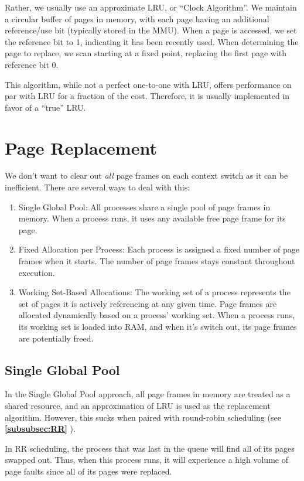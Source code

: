 \documentclass{report}
\newcommand{\exampleBegin}[1]{\begin{tcolorbox}[colback=blue!5!white,colframe=black!75!blue,title={Example:
      #1}]}
\newcommand{\exampleEnd}{\end{tcolorbox}}
\newcommand{\refto}[2]{\textbf{\ref{#1:#2} \nameref{#1:#2}}}
\begin{document}
Rather, we usually use an approximate LRU, or ``Clock Algorithm''. We maintain a circular buffer of
pages in memory, with each page having an additional reference/use bit (typically stored in the
MMU). When a page is accessed, we set the reference bit to 1, indicating it has been recently
used. When determining the page to replace, we scan starting at a fixed point, replacing the first
page with reference bit 0.

This algorithm, while not a perfect one-to-one with LRU, offers performance on par with LRU for a
fraction of the cost. Therefore, it is usually implemented in favor of a ``true'' LRU.





\section{Page Replacement}
We don't want to clear out \textit{all} page frames on each context switch as it can be
inefficient. There are several ways to deal with this:

\begin{enumerate}[label=\textit{(\roman*)}]
\item Single Global Pool: All processes share a single pool of page frames in memory. When a process
  runs, it uses any available free page frame for its page.
\item Fixed Allocation per Process: Each process is assigned a fixed number of page frames when it
  starts. The number of page frames stays constant throughout execution.
\item Working Set-Based Allocations: The working set of a process represents the set of pages it is
  actively referencing at any given time. Page frames are allocated dynamically based on a process'
  working set. When a process runs, its working set is loaded into RAM, and when it's switch out,
  its page frames are potentially freed.
\end{enumerate}


\subsection{Single Global Pool}
In the Single Global Pool approach, all page frames in memory are treated as a shared resource, and
an approximation of LRU is used as the replacement algorithm. However, this sucks when paired with
round-robin scheduling (see \refto{subsubsec}{RR}).

\exampleBegin{Fair or Unfair}
In RR scheduling, the process that was last in the queue will find all of its pages swapped
out. Thus, when this process runs, it will experience a high volume of page faults since all of its
pages were replaced.
\exampleEnd
\end{document}
